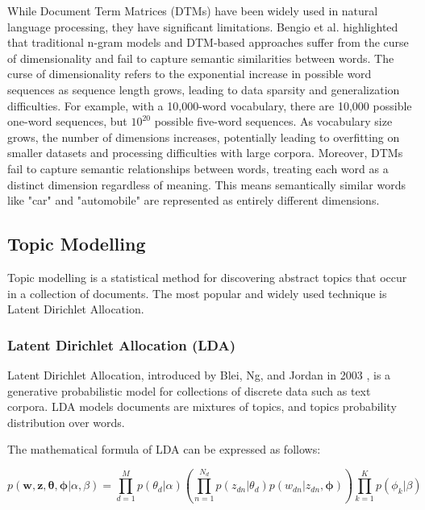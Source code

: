 \documentclass[a4paper, oneside]{discothesis}
\begin{document}
While Document Term Matrices (DTMs) have been widely used in natural language processing, they have significant limitations. Bengio et al. \cite{bengio2003neural} highlighted that traditional n-gram models and DTM-based approaches suffer from the curse of dimensionality and fail to capture semantic similarities between words.
The curse of dimensionality refers to the exponential increase in possible word sequences as sequence length grows, leading to data sparsity and generalization difficulties. For example, with a 10,000-word vocabulary, there are 10,000 possible one-word sequences, but $10^{20}$ possible five-word sequences.
As vocabulary size grows, the number of dimensions increases, potentially leading to overfitting on smaller datasets and processing difficulties with large corpora. Moreover, DTMs fail to capture semantic relationships between words, treating each word as a distinct dimension regardless of meaning. 
This means semantically similar words like "car" and "automobile" are represented as entirely different dimensions.

\subsection{Topic Modelling}
Topic modelling is a statistical method for discovering abstract topics that occur in a collection of documents. The most popular and widely used technique is Latent Dirichlet Allocation.

\subsubsection{Latent Dirichlet Allocation (LDA)}
Latent Dirichlet Allocation, introduced by Blei, Ng, and Jordan in 2003 \cite{blei2003latent}, is a generative probabilistic model for collections of discrete data such as text corpora. 
LDA models documents are mixtures of topics, and topics probability distribution over words.

The mathematical formula of LDA can be expressed as follows:

\begin{equation}
p(\mathbf{w}, \mathbf{z}, \boldsymbol{\theta}, \boldsymbol{\phi} | \alpha, \beta) = 
\prod_{d=1}^M p(\theta_d | \alpha) 
\left( \prod_{n=1}^{N_d} p(z_{dn} | \theta_d) p(w_{dn} | z_{dn}, \boldsymbol{\phi}) \right)
\prod_{k=1}^K p(\phi_k | \beta)
\end{equation}
\end{document}
